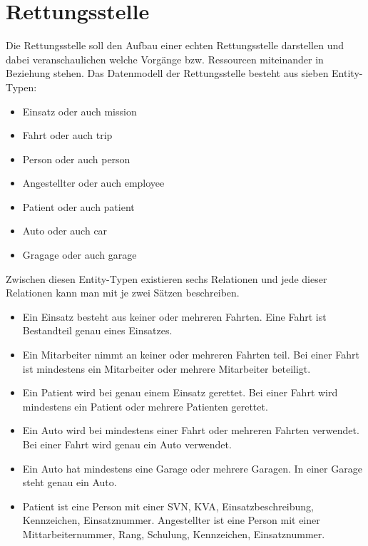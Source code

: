\section{Rettungsstelle}
\fib{}

\noindent
Die Rettungsstelle soll den Aufbau einer echten Rettungsstelle darstellen und dabei veranschaulichen welche Vorgänge bzw. Ressourcen miteinander in Beziehung stehen.
Das Datenmodell der Rettungsstelle besteht aus sieben Entity-Typen:

\begin{itemize}
    \item Einsatz oder auch mission
    \item Fahrt oder auch trip
    \item Person oder auch person
    \item Angestellter oder auch employee
    \item Patient oder auch patient
    \item Auto oder auch car
    \item Gragage oder auch garage
\end{itemize}

\noindent
Zwischen diesen Entity-Typen existieren sechs Relationen und jede dieser Relationen kann man mit je zwei Sätzen beschreiben.
\begin{itemize}
    \item Ein Einsatz besteht aus keiner oder mehreren Fahrten.\newline
          Eine Fahrt ist Bestandteil genau eines Einsatzes.
    \item Ein Mitarbeiter nimmt an keiner oder mehreren Fahrten teil. \newline
          Bei einer Fahrt ist mindestens ein Mitarbeiter oder mehrere Mitarbeiter beteiligt. 
    \item Ein Patient wird bei genau einem Einsatz gerettet. \newline
          Bei einer Fahrt wird mindestens ein Patient oder mehrere Patienten gerettet. 
    \item Ein Auto wird bei mindestens einer Fahrt oder mehreren Fahrten verwendet. \newline
          Bei einer Fahrt wird genau ein Auto verwendet.
    \item Ein Auto hat mindestens eine Garage oder mehrere Garagen. \newline
          In einer Garage steht genau ein Auto.
    \item Patient ist eine Person mit einer SVN, KVA, Einsatzbeschreibung, Kennzeichen, Einsatznummer. \newline
          Angestellter ist eine Person mit einer Mittarbeiternummer, Rang, Schulung, Kennzeichen, Einsatznummer.
\end{itemize}

\noindent